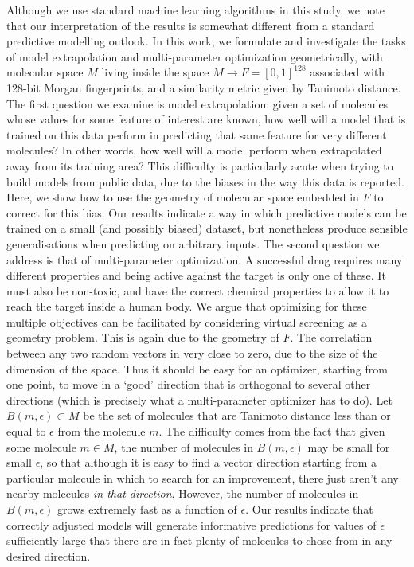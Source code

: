 \documentclass[journal=jacsat,manuscript=article]{achemso}
\begin{document}
Although we use standard machine learning algorithms in this study, we note that our interpretation of the results is somewhat different from a standard predictive modelling outlook. 
In this work, we formulate and investigate the tasks of model extrapolation and multi-parameter optimization geometrically, with molecular space $M$ living inside the space $M \to F = [0, 1]^{128}$ associated with 128-bit Morgan fingerprints, and a similarity metric given by Tanimoto distance. 
\newline
\newline
The first question we examine is model extrapolation: given a set of molecules whose values for some feature of interest are known, how well will a model that is trained on this data perform in predicting that same feature for very different molecules? In other words, how well will a model perform when extrapolated away from its training area? This difficulty is particularly acute when trying to build models from public data, due to the biases in the way this data is reported\cite{Kalliokoski2013,Tiikkainen2013}. Here, we show how to use the geometry of molecular space embedded in $F$ to correct for this bias. Our results indicate a way in which predictive models can be trained on a small (and possibly biased) dataset, but nonetheless produce sensible generalisations when predicting on arbitrary inputs.
\newline
\newline
The second question we address is that of multi-parameter optimization.  A successful drug requires many different properties and being active against the target is only one of these.  It must also be non-toxic, and have the correct chemical properties to allow it to reach the target inside a human body.  We argue that optimizing for these multiple objectives can be facilitated by considering virtual screening as a geometry problem.
This is again due to the geometry of $F$. The correlation between any two random vectors in very close to zero, due to the size of the dimension of the space.  Thus it should be easy for an optimizer, starting from one point, to move in a `good' direction that is orthogonal to several other directions (which is precisely what a multi-parameter optimizer has to do).  Let $B(m, \epsilon) \subset M$ be the set of molecules that are Tanimoto distance less than or equal to $\epsilon$ from the molecule $m$.  The difficulty comes from the fact that given some molecule $m \in M$, the number of molecules in  $B(m, \epsilon)$ may be small for small $\epsilon$, so that although it is easy to find a vector direction starting from a particular molecule in which to search for an improvement, there just aren't any nearby molecules \textit{in that direction}. However, the number of molecules in $B(m, \epsilon)$ grows extremely fast as a function of $\epsilon$.  Our results indicate that correctly adjusted models will generate informative predictions for values of $\epsilon$ sufficiently large that there are in fact plenty of molecules to chose from in any desired direction.
\end{document}
